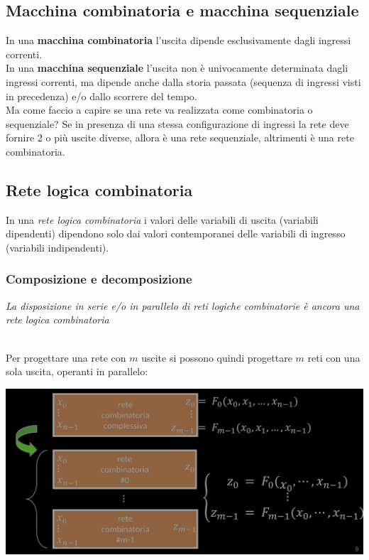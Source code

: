 \documentclass{article}
\begin{document}
\subsection{Macchina combinatoria e macchina sequenziale}
In una \textbf{macchina combinatoria} l'uscita dipende esclusivamente dagli ingressi correnti.
\vspace{0.2cm}\\
In una \textbf{macchina sequenziale} l'uscita non è univocamente determinata dagli ingressi correnti, ma dipende anche dalla storia passata (sequenza di ingressi visti in precedenza) e/o dallo scorrere del tempo.
\vspace{0.2cm}\\
Ma come faccio a capire se una rete va realizzata come combinatoria o sequenziale? Se in presenza di una stessa configurazione di ingressi la rete deve fornire 2 o più uscite diverse, allora è una rete sequenziale, altrimenti è una rete combinatoria.
\subsection{Rete logica combinatoria}
In una \textit{rete logica combinatoria} i valori delle variabili di uscita (variabili dipendenti) dipendono solo dai valori contemporanei delle variabili di ingresso (variabili indipendenti).
\subsubsection*{Composizione e decomposizione}
\begin{fbox}
{\textit{La disposizione in serie e/o in parallelo di reti logiche combinatorie è ancora una rete logica combinatoria}}
\end{fbox}
\vspace{0.1cm}\\
Per progettare una rete con $m$ uscite si possono quindi progettare $m$ reti con una sola uscita, operanti in parallelo:
\begin{center}
    \includegraphics[scale=0.35]{parallel.png}
\end{center}
\end{document}
